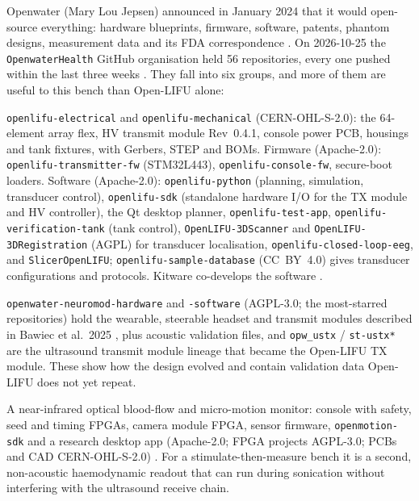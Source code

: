 \documentclass[11pt,a4paper]{article}
\begin{document}
Openwater (Mary Lou Jepsen) announced in January 2024 that it would open-source everything: hardware blueprints, firmware, software, patents, phantom designs, measurement data and its FDA correspondence \cite{openwater_open}. On 2026-10-25 the \texttt{OpenwaterHealth} GitHub organisation held 56 repositories, every one pushed within the last three weeks \cite{openwater_gh}. They fall into six groups, and more of them are useful to this bench than Open-LIFU alone:

\begin{description}[leftmargin=*,nosep]
\item[Open-LIFU (stimulation).] \texttt{openlifu-electrical} and \texttt{openlifu-mechanical} (CERN-OHL-S-2.0): the 64-element array flex, HV transmit module Rev~0.4.1, console power PCB, housings and tank fixtures, with Gerbers, STEP and BOMs. Firmware (Apache-2.0): \texttt{openlifu-transmitter-fw} (STM32L443), \texttt{openlifu-console-fw}, secure-boot loaders. Software (Apache-2.0): \texttt{openlifu-python} (planning, simulation, transducer control), \texttt{openlifu-sdk} (standalone hardware I/O for the TX module and HV controller), the Qt desktop planner, \texttt{openlifu-test-app}, \texttt{openlifu-verification-tank} (tank control), \texttt{OpenLIFU-3DScanner} and \texttt{OpenLIFU-3DRegistration} (AGPL) for transducer localisation, \texttt{openlifu-closed-loop-eeg}, and \texttt{SlicerOpenLIFU}; \texttt{openlifu-sample-database} (CC~BY~4.0) gives transducer configurations and protocols. Kitware co-develops the software \cite{openlifu}.
\item[Earlier neuromodulation generation.] \texttt{openwater-neuromod-hardware} and \texttt{-software} (AGPL-3.0; the most-starred repositories) hold the wearable, steerable headset and transmit modules described in Bawiec et al.\ 2025 \cite{bawiec2025}, plus acoustic validation files, and \texttt{opw\_ustx} / \texttt{st-ustx*} are the ultrasound transmit module lineage that became the Open-LIFU TX module. These show how the design evolved and contain validation data Open-LIFU does not yet repeat.
\item[Open-Motion (optical blood flow).] A near-infrared optical blood-flow and micro-motion monitor: console with safety, seed and timing FPGAs, camera module FPGA, sensor firmware, \texttt{openmotion-sdk} and a research desktop app (Apache-2.0; FPGA projects AGPL-3.0; PCBs and CAD CERN-OHL-S-2.0) \cite{openwater_gh,openwater_docs}. For a stimulate-then-measure bench it is a second, non-acoustic haemodynamic readout that can run during sonication without interfering with the ultrasound receive chain.

\end{description}
\end{document}
